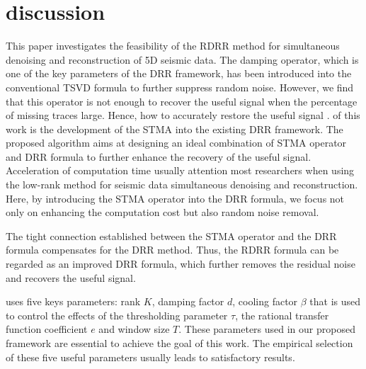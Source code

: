 \section{discussion}

This paper investigates the feasibility of the RDRR method for simultaneous denoising and reconstruction of 5D seismic data. The damping operator, which is one of the key parameters of the DRR framework, has been introduced into the conventional TSVD formula to further suppress random noise. However, we find that  this operator is not enough to recover the useful signal when the percentage of missing traces   large. Hence, how to accurately restore the useful signal .  of this work is the development of the STMA into the existing DRR framework. The proposed algorithm aims at designing an ideal combination of STMA operator and DRR formula to further enhance the recovery of the useful signal. Acceleration of computation time usually  attention  most researchers when using the low-rank method for seismic data simultaneous denoising and reconstruction. Here, by introducing the STMA operator into the DRR formula, we focus not only on enhancing the computation cost but also  random noise removal.

The tight connection established between the STMA operator and the DRR formula compensates for the DRR method. Thus, the RDRR formula can be regarded as an improved DRR formula, which further removes the residual noise and recovers the useful signal. 

 uses five keys parameters: rank $K$, damping factor $d$, cooling factor $\beta$ that is used to control the effects of the thresholding parameter $\tau$, the rational transfer function coefficient $e$ and window size $T$. These parameters used in our proposed framework are essential to achieve the goal of this work. The empirical selection of these five useful parameters usually leads to satisfactory results. 

